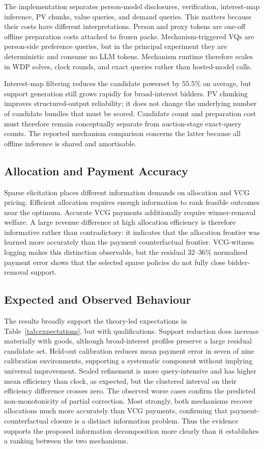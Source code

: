 The implementation separates person-model disclosures, verification,
interest-map inference, PV chunks, value queries, and demand queries. This
matters because their costs have different interpretations. Person and proxy
tokens are one-off offline preparation costs attached to frozen packs.
Mechanism-triggered VQs are person-side preference queries, but in the
principal experiment they are deterministic and consume no LLM tokens.
Mechanism runtime therefore scales in WDP solves, clock rounds, and exact
queries rather than hosted-model calls.

Interest-map filtering reduces the candidate powerset by 55.5\% on average,
but support generation still grows rapidly for broad-interest bidders. PV
chunking improves structured-output reliability; it does not change the
underlying number of candidate bundles that must be scored. Candidate count
and preparation cost must therefore remain conceptually separate from
auction-stage exact-query counts. The reported mechanism comparison concerns
the latter because all offline inference is shared and amortisable.

\subsection{Allocation and Payment Accuracy}

Sparse elicitation places different information demands on allocation and
VCG pricing. Efficient allocation requires enough information to rank
feasible outcomes near the optimum. Accurate VCG payments additionally
require winner-removal welfare. A large revenue difference at high
allocation efficiency is therefore informative rather than contradictory:
it indicates that the allocation frontier was learned more accurately than
the payment counterfactual frontier. VCG-witness logging makes this
distinction observable, but the residual 32--36\% normalised payment error
shows that the selected sparse policies do not fully close bidder-removal
support.

\subsection{Expected and Observed Behaviour}

The results broadly support the theory-led expectations in
Table~\ref{tab:expectations}, but with qualifications. Support reduction does
increase materially with goods, although broad-interest profiles preserve a
large residual candidate set. Held-out calibration reduces mean payment error
in seven of nine calibration environments, supporting a systematic component
without implying universal improvement. Sealed refinement is more
query-intensive and has higher mean efficiency than clock, as expected, but
the clustered interval on their efficiency difference crosses zero. The
observed worse cases confirm the predicted non-monotonicity of partial
correction. Most strongly, both mechanisms recover allocations much more
accurately than VCG payments, confirming that payment-counterfactual closure
is a distinct information problem. Thus the evidence supports the proposed
information decomposition more clearly than it establishes a ranking between
the two mechanisms.

